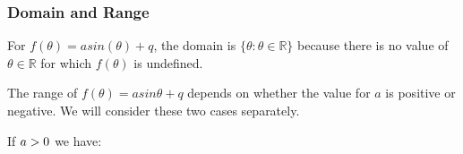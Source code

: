             \subsubsection{ Domain and Range}
            \nopagebreak
            
          
          \label{m39414*id85450}For \begin{math}f\left(\theta \right)=asin\left(\theta \right)+q\end{math}, the domain is \begin{math}\{\theta :\theta \in \mathbb{R}\}\end{math} because there is no value of \begin{math}\theta \in \mathbb{R}\end{math} for which \begin{math}f\left(\theta \right)\end{math} is undefined.\par 
          \label{m39414*id85550}The range of \begin{math}f\left(\theta \right)=asin\theta +q\end{math} depends on whether the value for \begin{math}a\end{math} is positive or negative. We will consider these two cases separately.\par 
          \label{m39414*id85596}If \begin{math}a>{}0\end{math} we have:\par 
          \label{m39414*id85612}\nopagebreak\noindent{}
